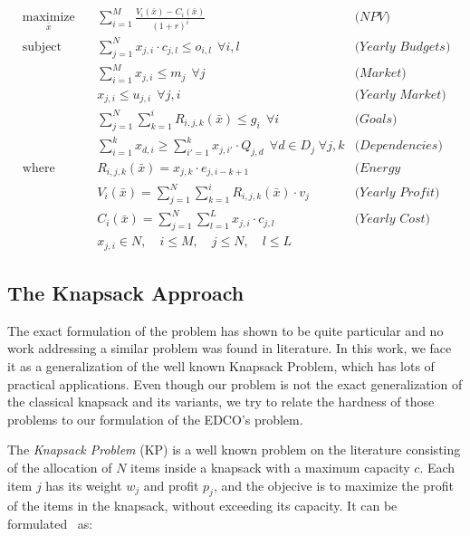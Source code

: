     \begin{equation}
    \label{eq:pmmlpo++}
      \begin{aligned}
	 & \underset{\bar{x}}{\text{maximize}}  & & \sum_{i=1}^{M} \frac{V_i(\bar{x}) - C_i(\bar{x})}{(1 + r)^i}	 					& \textit{(NPV)} \\
	 & \text{subject to} 			& & \sum_{j=1}^{N} x_{j, i} \cdot c_{j,l} \le o_{i,l} \, \; \forall i, l 					& \textit{(Yearly Budgets)} \\
	 & 					& & \sum_{i=1}^{M} x_{j, i} \le m_j \, \; \forall j 								& \textit{(Market)} \\
	 & 					& & x_{j, i} \le u_{j, i} \, \; \forall j, i 									& \textit{(Yearly Market)} \\
	 & 					& & \sum_{j=1}^{N} \sum_{k=1}^{i}R_{i,j,k}(\bar{x}) \leq g_i \, \; \forall i 					& \textit{(Goals)} \\
	 & 					& & \sum_{i=1}^{k} x_{d, i} \ge \sum_{i'=1}^{k} x_{j, i'} \cdot Q_{j, d} \, \; \forall d \in D_j\;  \forall j,k & \textit{(Dependencies)}\\
	 & \text{where}				& &  R_{i,j,k}(\bar{x}) = x_{j, k} \cdot e_{j, i - k + 1} 							& \textit{(Energy Recovery)}\\
	 & 					& & V_{i}(\bar{x}) = \sum_{j=1}^{N} \sum_{k=1}^{i} R_{i, j, k}(\bar{x}) \cdot v_j 				& \textit{(Yearly Profit)}\\
	 & 					& & C_{i}(\bar{x}) = \sum_{j=1}^{N} \sum_{l=1}^{L} x_{j, i} \cdot c_{j,l} 					& \textit{(Yearly Cost)}\\
	 & 					& & x_{j,i} \in N, \quad i \le M, \quad j \le N, \quad l \le L
      \end{aligned}
    \end{equation}

\subsection{The Knapsack Approach}
\label{sec:model:knap}

The exact formulation of the problem has shown to be quite particular and no work addressing 
a similar problem was found in literature. In this work, we face it as a generalization
of the well known Knapsack Problem, which has lots of practical applications. 
Even though our problem is not the exact generalization of the classical knapsack
and its variants, we try to relate the hardness of those problems to our formulation of the
EDCO's problem.

The \textit{Knapsack Problem} (KP) is a well known problem on the literature consisting of the allocation of $N$ items inside a 
knapsack with a maximum capacity $c$. Each item $j$ has its weight $w_j$ and profit $p_j$, and the objecive is to 
maximize the profit of the items in the knapsack, without exceeding its capacity. It can be formulated~\cite{pisinger1995} as:


